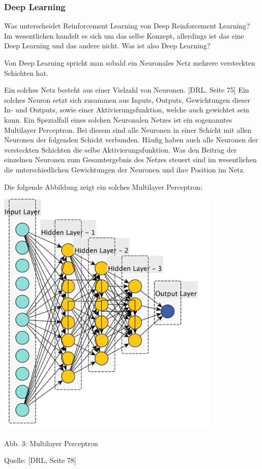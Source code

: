 \subsubsection{Deep Learning}
Was unterscheidet Reinforcement Learning von Deep Reinforcement Learning? Im wesentlichen handelt es sich um das selbe Konzept, allerdings ist das eine Deep Learning und das andere nicht. Was ist also Deep Learning?

Von Deep Learning spricht man sobald ein Neuronales Netz mehrere versteckten Schichten hat. 

Ein solches Netz besteht aus einer Vielzahl von Neuronen. [DRL, Seite 75] Ein solches Neuron setzt sich zusammen aus Inputs, Outputs, Gewichtungen dieser In- und Outputs, sowie einer Aktivierungsfunktion, welche auch gewichtet sein kann. Ein Spezialfall eines solchen Neuronalen Netzes ist ein sogenanntes Multilayer Perceptron. Bei diesem sind alle Neuronen in einer Schicht mit allen Neuronen der folgenden Schicht verbunden. Häufig haben auch alle Neuronen der versteckten Schichten die selbe Aktivierungsfunktion. Was den Beitrag der einzelnen Neuronen zum Gesamtergebnis des Netzes steuert sind im wesentlichen die unterschiedlichen Gewichtungen der Neuronen und ihre Position im Netz.

\begin{minipage}{\linewidth}
	Die folgende Abbildung zeigt ein solches Multilayer Perceptron:
	
	\vspace{0.5cm}
	\includegraphics[width=0.8\textwidth]{Bilder/mlp} 
	
	Abb. 3: Multilayer Perceptron
	
	Quelle: [DRL, Seite 78]\\
\end{minipage}


